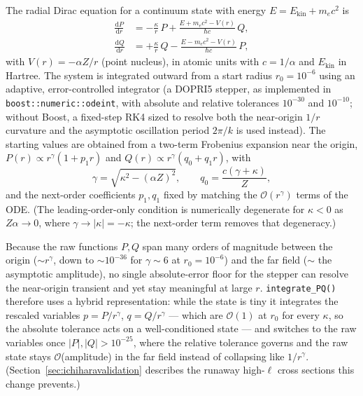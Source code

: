 \documentclass[11pt,a4paper]{article}
\newcommand{\dif}{\mathrm{d}}
\begin{document}
The radial Dirac equation for a continuum state with energy
$E = E_{\mathrm{kin}} + m_{e}c^{2}$ is
\begin{align}
  \frac{\dif P}{\dif r} &= -\frac{\kappa}{r}\,P
    + \frac{E + m_{e}c^{2} - V(r)}{\hbar c}\,Q,\\
  \frac{\dif Q}{\dif r} &= +\frac{\kappa}{r}\,Q
    - \frac{E - m_{e}c^{2} - V(r)}{\hbar c}\,P,
\end{align}
with $V(r) = -\alpha Z / r$ (point nucleus), in atomic units with
$c=1/\alpha$ and $E_{\mathrm{kin}}$ in Hartree.  The system is
integrated outward from a start radius $r_{0}=10^{-6}$ using an
adaptive, error-controlled integrator (a DOPRI5 stepper, as implemented
in {\tt boost::numeric::odeint}, with absolute and relative tolerances
$10^{-30}$ and $10^{-10}$; without Boost, a fixed-step RK4 sized to
resolve both the near-origin $1/r$ curvature and the asymptotic
oscillation period $2\pi/k$ is used instead).  The starting values are
obtained from a two-term Frobenius expansion near the origin,
$P(r) \propto r^{\gamma}(1+p_{1}r)$ and
$Q(r) \propto r^{\gamma}(q_{0}+q_{1}r)$, with
\begin{equation}
  \gamma = \sqrt{\kappa^{2}-(\alpha Z)^{2}},
  \qquad q_{0} = \frac{c(\gamma+\kappa)}{Z},
\end{equation}
and the next-order coefficients $p_{1},q_{1}$ fixed by matching the
$\mathcal{O}(r^{\gamma})$ terms of the ODE.  (The leading-order-only
condition is numerically degenerate for $\kappa<0$ as $Z\alpha\to0$,
where $\gamma\to|\kappa|=-\kappa$; the next-order term removes that
degeneracy.)

Because the raw functions $P,Q$ span many orders of magnitude between
the origin ($\sim r^{\gamma}$, down to $\sim10^{-36}$ for
$\gamma\sim6$ at $r_{0}=10^{-6}$) and the far field ($\sim$ the
asymptotic amplitude), no single absolute-error floor for the stepper
can resolve the near-origin transient and yet stay meaningful at large
$r$.  {\tt integrate\_PQ()} therefore uses a hybrid representation:
while the state is tiny it integrates the rescaled variables
$p=P/r^{\gamma}$, $q=Q/r^{\gamma}$ --- which are $\mathcal{O}(1)$ at
$r_{0}$ for every $\kappa$, so the absolute tolerance acts on a
well-conditioned state --- and switches to the raw variables once
$|P|,|Q|>10^{-25}$, where the relative tolerance governs and the raw
state stays $\mathcal{O}$(amplitude) in the far field instead of
collapsing like $1/r^{\gamma}$.  (Section~\ref{sec:ichiharavalidation}
describes the runaway high-$\ell$ cross sections this change prevents.)
\end{document}
